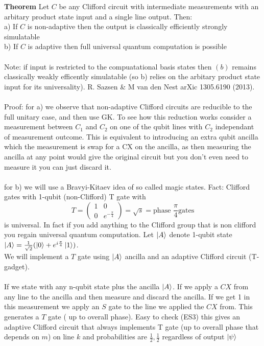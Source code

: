 \documentclass{article}
\begin{document}
               \textbf{Theorem} Let $C$ be any Clifford circuit with intermediate measurements with an arbitary product state input and a single line output. Then:\\
               a) If $C$ is non-adaptive then the output is classically efficiently strongly simulatable\\
               b) If $C$ is adaptive then full universal quantum computation is possible\\\\
                       Note: if input is restricted to the compuatational basis states then $(b)$ remains classically weakly efficently simulatable (so b) relies on the arbitary product state input for its universality). R. Sazsen & M van den Nest arXic 1305.6190 (2013).\\\\
                       Proof: for a) we observe that non-adaptive Clifford circuits are reducible to the full unitary case, and then use GK. To see how this reduction works consider a measurement between $C_1$ and $C_2$ on one of the qubit lines with $C_2$ independant of measurement outcome. This is equivalent to introducing an extra qubit ancilla which the measurement is swap for a CX on the ancilla, as then measuring the ancilla at any point would give the original circuit but you don't even need to measure it you can just discard it.\\\\
                       for b) we will use a Bravyi-Kitaev idea of so called magic states. Fact: Clifford gates with 1-qubit (non-Clifford) T gate with 
                       $$
                        T= \begin{pmatrix} 1 & 0 \\ 0 & e^{- \frac{\pi}{4}} \end{pmatrix} = \sqrt{s} = \text{phase } \frac{\pi}{4} \text{gates}
                       $$
                       is universal. In fact if you add anything to the Clifford group that is non clifford you regain universal quantum computation. Let $\ket{A}$ denote 1-qubit state $\ket{A} = \frac{1}{\sqrt{2}} (\ket{0} + e^{i \frac{\pi}{4}} \ket{1})$. \\We will implement a $T$ gate using $\ket{A}$ ancilla and an adaptive Clifford circuit (T-gadget).\\\\
                       If we state with any n-qubit state plus the ancilla $\ket{A}$. If we apply a $CX$ from any line to the ancilla and then measure and discard the ancilla. If we get 1 in this measurement we apply an $S$ gate to the line we applied the $CX$ from. This generates a $T$ gate ( up to overall phase). Easy to check (ES3) this gives an adaptive Clifford circuit that always implements T gate (up to overall phase that depends on $m$) on line $k$ and probabilities are $\frac{1}{2}, \frac{1}{2}$ regardless of output $\ket{\psi}$\\\\
\end{document}
